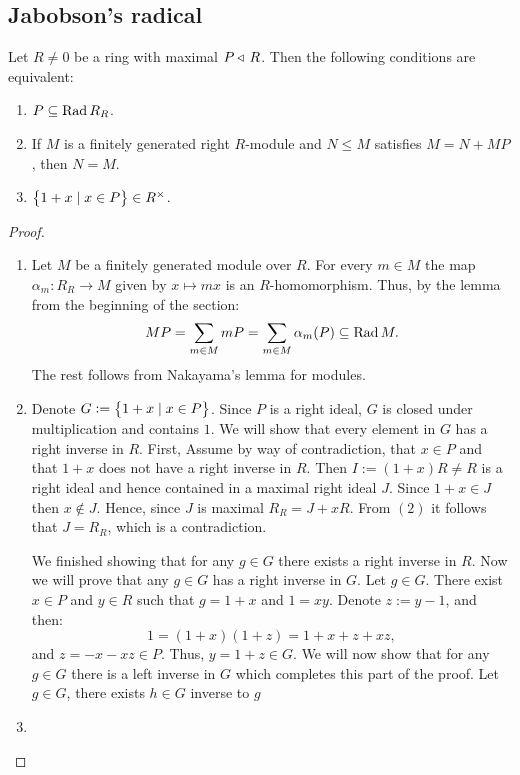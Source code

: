 \documentclass[11pt,a4paper]{article}
\begin{document}
\subsection{Jabobson's radical}

\begin{lemma}
  \label{lem:nakayama}
  Let $R \neq 0$ be a ring with maximal $P \triangleleft\, R$.
  Then the following conditions are equivalent:
  \begin{enumerate}
    \item[(1)] $P \subseteq \operatorname{Rad} R_R$.
    \item[(2)] If $M$ is a finitely generated right $R$-module
      and $N \leqslant M$ satisfies $M = N + MP$,
      then $N = M$.
    \item[(3)] $\left\{1 + x \mid x \in P\right\} \in R^{\times}$.
  \end{enumerate}
\end{lemma}
\begin{proof} \phantom{}
  \begin{enumerate}
    \item[$(1) \implies (2)$]
      Let $M$ be a finitely generated module over $R$.
      For every $m \in M$ the map $\alpha_m \colon R_R \to M$
      given by $x \mapsto mx$ is an $R$-homomorphism.
      Thus, by the lemma from the beginning of the section:
      \[
        MP =
        \sum_{m \in M} mP =
        \sum_{m \in M} \alpha_m(P) \subseteq
        \operatorname{Rad} M.
      \]
      The rest follows from Nakayama's lemma for modules.
    \item[$(2) \implies (3)$] Denote $G := \left\{1 + x \mid x \in P\right\}$.
      Since $P$ is a right ideal,
      $G$ is closed under multiplication and contains $1$.
      We will show that every element in $G$ has a right inverse in $R$.
      First, Assume by way of contradiction, that $x \in P$
      and that $1 + x$ does not have a right inverse in $R$.
      Then $I := (1+x) R \neq R$ is a right ideal and hence contained in a
      maximal right ideal $J$.
      Since $1 + x \in J$ then $x \notin J$.
      Hence, since $J$ is maximal $R_R = J + xR$.
      From $(2)$ it follows that $J = R_R$,
      which is a contradiction.

      We finished showing that for any $g \in G$ there exists a right inverse
      in $R$.
      Now we will prove that any $g \in G$ has a right inverse in $G$.
      Let $g \in G$.
      There exist $x \in P$ and $y \in R$ such that $g = 1 + x$
      and $1 = xy$.
      Denote $z := y - 1$, and then:
      \[
        1 = (1 + x) (1 + z) = 1 + x + z + xz,
      \]
      and $z = -x - xz \in P$.
      Thus, $y = 1 + z \in G$.
      We will now show that for any $g \in G$ there is a left inverse in $G$
      which completes this part of the proof.
      Let $g \in G$, there exists $h \in G$ inverse to $g$
    \item[$(3)$]
  \end{enumerate}
\end{proof}
\end{document}

